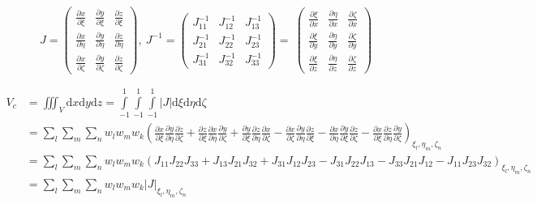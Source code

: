 \documentclass[11pt]{article}
\newcommand{\Vc}{V_c}
\newcommand{\xxi}{\frac{\partial x}{\partial \xi}}
\newcommand{\yxi}{\frac{\partial y}{\partial \xi}}
\newcommand{\zxi}{\frac{\partial z}{\partial \xi}}
\newcommand{\xeta}{\frac{\partial x}{\partial \eta}}
\newcommand{\yeta}{\frac{\partial y}{\partial \eta}}
\newcommand{\zeeta}{\frac{\partial z}{\partial \eta}}
\newcommand{\xzeta}{\frac{\partial x}{\partial \zeta}}
\newcommand{\yzeta}{\frac{\partial y}{\partial \zeta}}
\newcommand{\zzeta}{\frac{\partial z}{\partial \zeta}}
\newcommand{\xix}{\frac{\partial \xi}{\partial x}}
\newcommand{\xiy}{\frac{\partial \xi}{\partial y}}
\newcommand{\xiz}{\frac{\partial \xi}{\partial z}}
\newcommand{\etax}{\frac{\partial \eta}{\partial x}}
\newcommand{\etay}{\frac{\partial \eta}{\partial y}}
\newcommand{\etaz}{\frac{\partial \eta}{\partial z}}
\newcommand{\zetax}{\frac{\partial \zeta}{\partial x}}
\newcommand{\zetay}{\frac{\partial \zeta}{\partial y}}
\newcommand{\zetaz}{\frac{\partial \zeta}{\partial z}}
\newcommand{\md}{\mbox{d}}
\newcommand{\Int}{\int\limits}
\begin{document}
\begin{enumerate}
 \begin{equation*}
	J =
	\begin{pmatrix}
	\xxi & \yxi  & \zxi   \\
	\xeta & \yeta & \zeeta   \\
	\xzeta & \yzeta & \zzeta  
	\end{pmatrix},\:
	J^{-1} =
	\begin{pmatrix}
	J_{11}^{-1} & J_{12}^{-1}  &  J_{13}^{-1}  \\
	J_{21}^{-1} & J_{22}^{-1} & J_{23}^{-1}   \\
	J_{31}^{-1} & J_{32}^{-1} & J_{33}^{-1}  
	\end{pmatrix} =\:
	\begin{pmatrix}
	\xix & \etax  & \zetax   \\
	\xiy & \etay & \zetay   \\
	\xiz & \etaz & \zetaz  
	\end{pmatrix}
\end{equation*} 

	\begin{align*}
	\Vc &= \iiint_V \md x \md y \md z = \Int_{-1}^{1}  \Int_{-1}^{1} \Int_{-1}^{1} |J| \md \xi \md \eta \md \zeta \\
	&= \sum_l \sum_m \sum_n w_l w_m w_k \left( \xxi \yeta \zzeta + \zxi \xeta \yzeta + \yxi \zeeta \xzeta - \xzeta \yeta \zxi - \xeta \yxi \zzeta - \xxi \zeeta \yzeta \right)_{\xi_l, \eta_m, \zeta_n}\\
	&= \sum_l \sum_m \sum_n w_l w_m w_k \left( J_{11} J_{22} J_{33} + J_{13} J_{21} J_{32} + J_{31} J_{12} J_{23} - J_{31} J_{22} J_{13} - J_{33} J_{21} J_{12} -J_{11} J_{23} J_{32}\right)_{\xi_l, \eta_m, \zeta_n} \\
	&= \sum_l \sum_m \sum_n w_l w_m w_k |J|_{\xi_l, \eta_m, \zeta_n}
	\end{align*}
	

\end{enumerate}
\end{document}

